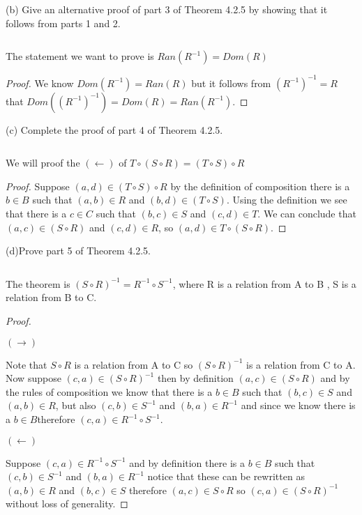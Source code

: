 \documentclass{article}
\begin{document}
(b) Give an alternative proof of part 3 of Theorem 4.2.5 by showing that it follows  from parts 1 and 2.

$ $


The statement we want to prove is $Ran(R^{-1})= Dom(R)$
\begin{proof}
    We know $Dom(R^{-1})=Ran(R)$
    but it follows from $(R^{-1})^{-1}=R$ that $Dom((R^{-1})^{-1})=Dom(R)=Ran(R^{-1})$.
\end{proof}

(c) Complete the proof of part 4 of Theorem 4.2.5.

$ $

We will proof the $(\leftarrow)$ of $T \circ (S \circ R)= (T \circ S )\circ R$
\begin{proof}
Suppose  $(a,d) \in (T \circ S) \circ R$ by the definition of composition there is a $b \in B$ such that $(a,b) \in R$ and $(b,d)\in (T \circ S)$. Using the definition we see that there is a $c \in C$ such that $(b,c) \in S$ and $(c,d) \in T$. We can conclude that $(a,c)\in (S \circ R)$ and $(c,d) \in R$, so $(a,d) \in T \circ (S \circ R)$.
\end{proof}

(d)Prove part 5 of Theorem 4.2.5.

$ $


The theorem is $(S \circ R)^{-1}= R^{-1} \circ S^{-1}$, where R is a relation from A to B , S is a relation from B to C.



\begin{proof}

$ $

$(\rightarrow)$



    Note that $S \circ R$ is a relation from A to C so $(S \circ R)^{-1}$ is a relation from C to A. Now suppose $(c,a) \in (S \circ R)^{-1}$ then by definition $(a,c) \in (S \circ R)$ and by the rules of composition we know that there is a $b \in B$ such that $(b,c) \in S$ and $(a,b) \in R$, but also $(c,b) \in S^{-1}$ and $(b,a) \in R^{-1}$  and since we know there is a $b \in B$therefore $(c,a) \in R^{-1} \circ S^{-1}$.
$ $


$(\leftarrow)$

Suppose $(c,a) \in R^{-1} \circ S^{-1}$ and by definition there is a $b \in B$ such that $(c,b) \in S^{-1}$ and $(b,a) \in R^{-1}$ notice that these can be rewritten as $(a,b) \in R$ and $(b,c)\in S$ therefore $(a,c) \in S \circ R$ so $(c,a) \in (S \circ R)^{-1}$ without loss of generality.

\end{proof}
\end{document}
